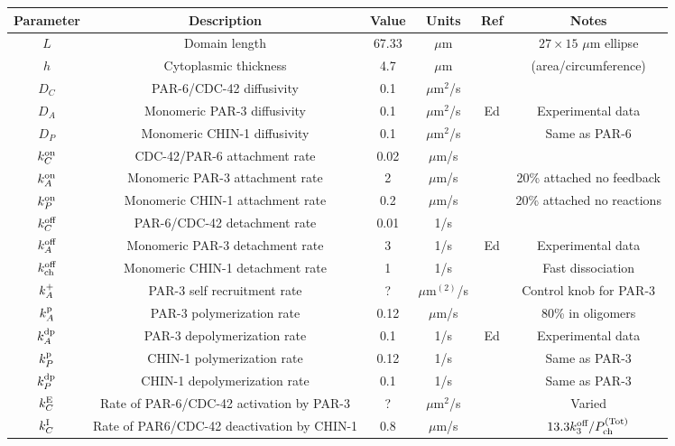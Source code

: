 \documentclass[11pt]{article}
\newcommand{\6}[1]{#1_{\text{6}}}
\newcommand{\3}[1]{#1_{\text{3}}}
\newcommand{\CHIN}[1]{#1_{\text{ch}}}
\newcommand{\Tot}[1]{#1^\text{(Tot)}}
\newcommand{\A}[1]{#1_A}
\newcommand{\Chin}[1]{#1_P}
\newcommand{\C}[1]{#1_C}
\begin{document}
\iffalse
\begin{table}
\begin{small}
\centering
\begin{tabular}{|c|c|c|c|c|c|}\hline
Parameter & Description & Value & Units & Ref & Notes \\ \hline
$L$ & Domain length & 67.33 & $\mu$m &  \cite{goehring2011polarization} & $27 \times 15$ $\mu$m ellipse\\
$h$ & Cytoplasmic thickness & 4.7 & $\mu$m &  \cite{goehring2011polarization}  &  (area/circumference)\\ \hline
$\C{D}$ & PAR-6/CDC-42 diffusivity & 0.1 & $\mu$m$^2$/s & \cite{robin2014single} &\\
$\A{D} $ & Monomeric PAR-3 diffusivity & 0.1 & $\mu$m$^2$/s & Ed & Experimental data \\
$\Chin{D}$ & Monomeric CHIN-1 diffusivity & 0.1 & $\mu$m$^2$/s & & Same as PAR-6 \\  \hline
$\C{\kon}$ & CDC-42/PAR-6 attachment rate & 0.02 & $\mu$m/s & \cite{gross2019guiding} & \\
$\A{\kon}$ & Monomeric PAR-3 attachment rate & 2 & $\mu$m/s & & 20\% attached no feedback\\
$\Chin{\kon}$ & Monomeric CHIN-1 attachment rate & 0.2 & $\mu$m/s & & 20\% attached no reactions\\ \hline
$\C{\koff} $ & PAR-6/CDC-42 detachment rate & 0.01 & 1/s & \cite{robin2014single}& \\
$\A{\koff}$ & Monomeric PAR-3 detachment rate &  3& 1/s & Ed & Experimental data\\
$\CHIN{\koff}$ & Monomeric CHIN-1 detachment rate & 1 & 1/s & &  Fast dissociation\\  \hline
$\A{\kf}$ & PAR-3 self recruitment rate &? & $\mu$m$^{(2)}$/s & & Control knob for PAR-3\\
$\A{\kp}$ & PAR-3 polymerization rate & 0.12& $\mu$m/s & & 80\% in oligomers \\
$\A{\kdp}$ & PAR-3 depolymerization rate & 0.1 & 1/s & Ed & Experimental data \\
$\Chin{\kp}$ & CHIN-1 polymerization rate & 0.12 & 1/s & &  Same as PAR-3\\
$\Chin{\kdp}$ & CHIN-1 depolymerization rate & 0.1 & 1/s & & Same as PAR-3 \\ \hline
$\C{\kE}$ & Rate of PAR-6/CDC-42 activation by PAR-3 & ? & $\mu$m$^2$/s & & Varied \\
$\C{\kI}$ & Rate of PAR6/CDC-42 deactivation by CHIN-1 & 0.8 & $\mu$m/s & \cite{sailer2015dynamic}& $13.3\3{\koff}/\Tot{\CHIN{P}}$\\

\end{tabular}
\end{small}
\end{table}
\end{document}
